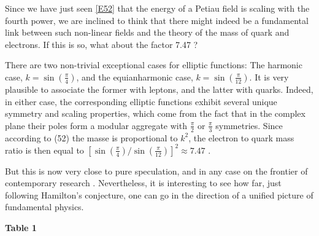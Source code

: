 \documentclass [12pt,a4paper      ]{article}
\begin{document}
     Since  we  have just seen \eqref{E52} that the energy of  a  Petiau 
field  is  scaling with the fourth power,  we are inclined to  think 
that  there might indeed be a fundamental link between such  non-linear fields and the theory of the mass of quark and  electrons.  
If this is so, what about the factor 7.47 ?

     There  are  two non-trivial exceptional cases  for  elliptic 
functions:  The harmonic  case, $k = \sin(\frac{\pi}{4})$, and the 
equianharmonic case, $k = \sin(\frac{\pi}{12})$.  It is very plausible  to 
associate  the former with leptons,  and the latter with  quarks.  
Indeed,  in  either case,  the corresponding  elliptic  functions 
exhibit  several  unique symmetry and scaling  properties,  which 
come  from the fact that in the complex plane their poles form  a 
modular aggregate with  $\frac{\pi}{2}$ or $\frac{\pi}{3}$ symmetries.  Since 
according to 
(52) the masse is proportional to $k^2$,  the electron to quark mass 
ratio is then equal to $[ \sin(\frac{\pi}{4}) / \sin(\frac{\pi}{12}) ]^2 \approx 7.47$ .

     But this is now very close to pure speculation,  and in  any 
case    on  the  frontier  of  contemporary   research   \cite{R43}.  
Nevertheless,  it is interesting to see how far, just following 
Hamilton's  conjecture,  one  can  go in the  direction of a  
unified picture of fundamental physics.



\begin{center}
                           {\bf \Large Table 1 }
\end{center}
\end{document}
